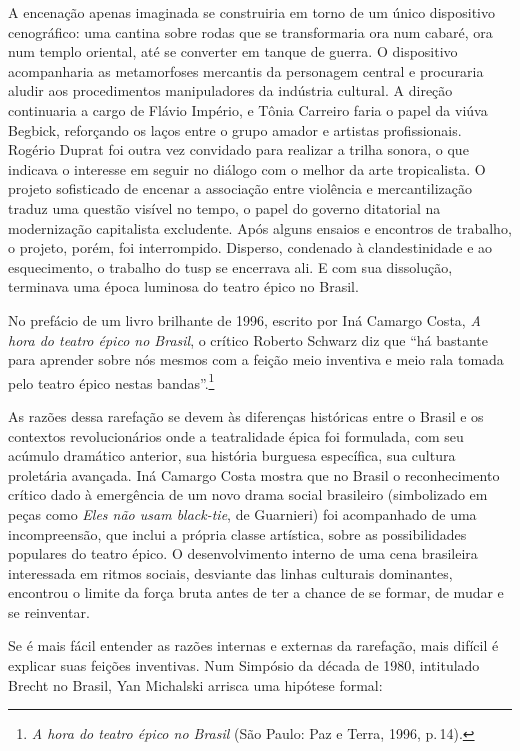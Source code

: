 A encenação apenas imaginada se construiria em torno de um único
dispositivo cenográfico: uma cantina sobre rodas que se transformaria
ora num cabaré, ora num templo oriental, até se converter em tanque de
guerra. O dispositivo acompanharia as metamorfoses mercantis da
personagem central e procuraria aludir aos procedimentos manipuladores
da indústria cultural. A direção continuaria a cargo de Flávio Império,
e Tônia Carreiro faria o papel da viúva Begbick, reforçando os laços
entre o grupo amador e artistas profissionais. Rogério Duprat foi outra
vez convidado para realizar a trilha sonora, o que indicava o interesse
em seguir no diálogo com o melhor da arte tropicalista. O projeto
sofisticado de encenar a associação entre violência e mercantilização
traduz uma questão visível no tempo, o papel do governo ditatorial na
modernização capitalista excludente. Após alguns ensaios e encontros de
trabalho, o projeto, porém, foi interrompido. Disperso, condenado à
clandestinidade e ao esquecimento, o trabalho do {\sc tusp} se encerrava ali.
E com sua dissolução, terminava uma época luminosa do teatro épico no
Brasil.

No prefácio de um livro brilhante de 1996, escrito por Iná Camargo
Costa, {\it A hora do teatro épico no Brasil}, o crítico Roberto Schwarz
diz que “há bastante para aprender sobre nós mesmos com a feição meio
inventiva e meio rala tomada pelo teatro épico nestas
bandas”.\footnote{{\it A hora do teatro épico no Brasil} (São Paulo: Paz
  e Terra, 1996, p.\,14).}

As razões dessa rarefação se devem às diferenças históricas entre o
Brasil e os contextos revolucionários onde a teatralidade épica foi
formulada, com seu acúmulo dramático anterior, sua história burguesa
específica, sua cultura proletária avançada. Iná Camargo Costa mostra
que no Brasil o reconhecimento crítico dado à emergência de um novo
drama social brasileiro (simbolizado em peças como {\it Eles não usam
black-tie}, de Guarnieri) foi acompanhado de uma incompreensão, que
inclui a própria classe artística, sobre as possibilidades populares do
teatro épico. O desenvolvimento interno de uma cena brasileira
interessada em ritmos sociais, desviante das linhas culturais
dominantes, encontrou o limite da força bruta antes de ter a chance de
se formar, de mudar e se reinventar.

Se é mais fácil entender as razões internas e externas da rarefação,
mais difícil é explicar suas feições inventivas. Num Simpósio da década
de 1980, intitulado Brecht no Brasil, Yan Michalski arrisca uma hipótese
formal:

